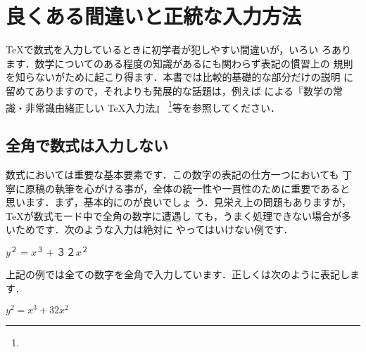 %



\section{良くある間違いと正統な入力方法}

\TeX で数式を入力しているときに初学者が犯しやすい間違いが，いろい
ろあります．数学についてのある程度の知識があるにも関わらず表記の慣習上の
規則を知らないがために起こり得ます．本書では比較的基礎的な部分だけの説明
に留めてありますので，それよりも発展的な話題は，例えば
による『数学の常識・非常識\zdash 由緒正しい \TeX 入力法』
\footnote{\webOdaTeX}等を参照してください．

\subsection{全角で数式は入力しない}

%
%
数式においては重要な基本要素です．この数字の表記の仕方一つにおいても
丁寧に原稿の執筆を心がける事が，全体の統一性や一貫性のために重要であると
思います．まず，基本的にのが良いでしょ
う．見栄え上の問題もありますが，\TeX が数式モード中で全角の数字に遭遇し
ても，うまく処理できない場合が多いためです．次のような入力は絶対に
やってはいけない例です．
\begin{InOut}
$y^２ = x^３ + ３２x^２$
\end{InOut}
上記の例では全ての数字を全角で入力しています．正しくは次のように表記します．
\begin{InOut}
$y^2 = x^3 + 32x^2$
\end{InOut}


